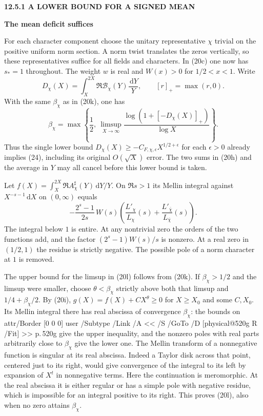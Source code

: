 \documentclass[11pt,letterpaper]{article}
\makeatletter
\newcommand{\rightmarktext}{}
\newcommand{\printfolio}{}
\newcommand{\leaf}[4]{\clearpage\gdef\printfolio{#1}\gdef\rightmarktext{#2}%
  {\small\sffamily\bfseries\color{ink}#3\par}\vspace{3pt}%
  {\LARGE\bfseries #4\par}\vspace{5pt}}
\newcommand{\dd}{\,\mathrm d}
\newcommand{\MusicPDFPageRef}[1]{\pdfpageref\csname physical@#1\endcsname\space\space 0 R}
\newcommand{\pagelink}[2]{\leavevmode\pdfstartlink attr{/Border [0 0 0]} user{%
  /Subtype /Link /A << /S /GoTo /D [\MusicPDFPageRef{#1} /Fit] >>}%
  {\color{ink}#2}\pdfendlink}
\newcommand{\pg}[1]{\pagelink{#1}{p.\,#1}}
\makeatother
\begin{document}
\leaf{520h}{A one-sided prime estimate}{12.5.1 \quad A LOWER BOUND FOR A SIGNED MEAN}{The mean deficit suffices}
For each character component choose the unitary representative $\chi$
trivial on the positive uniform norm section. A norm twist translates
the zeros vertically, so these representatives suffice for all fields
and characters. In (20c) one now has $s_*=1$ throughout. The weight
$w$ is real and $W(x)>0$ for $1/2<x<1$. Write
\[
       D_\chi(X)=\int_X^{2X}\Re\mathcal B_\chi(Y)\frac{\dd Y}{Y},
       \qquad [r]_+=\max(r,0).
\]
With the same $\beta_\chi$ as in (20k), one has
\[
 \beta_\chi=\max\left\{\frac12,\ \limsup_{X\to\infty}
       \frac{\log(1+[-D_\chi(X)]_+)}{\log X}\right\}.
 \tag{20l}
\]
Thus the single lower bound $D_\chi(X)\ge-C_{F,\chi,\epsilon}
X^{1/2+\epsilon}$ for each $\epsilon>0$ already implies (24),
including its original $O(\sqrt X)$ error. The two sums in (20h)
and the average in $Y$ may all cancel before this lower bound is taken.

Let $f(X)=\int_X^{2X}\Re A^\sharp_\chi(Y)\dd Y/Y$. On $\Re s>1$ its
Mellin integral against $X^{-s-1}\dd X$ on $(0,\infty)$ equals
\[
 -\frac{2^s-1}{2s}\,W(s)
 \left(\frac{L'_\chi}{L_\chi}(s)+\frac{L'_{\bar\chi}}{L_{\bar\chi}}(s)\right).
\]
The integral below $1$ is entire. At any nontrivial zero the orders of
the two functions add, and the factor $(2^s-1)W(s)/s$ is nonzero.
At a real zero in $(1/2,1)$ the residue is strictly negative. The
possible pole of a norm character at $1$ is removed.

The upper bound for the limsup in (20l) follows from (20k). If
$\beta_\chi>1/2$ and the limsup were smaller, choose $\theta<\beta_\chi$
strictly above both that limsup and $1/4+\beta_\chi/2$. By (20i),
$g(X)=f(X)+CX^\theta\ge0$ for $X\ge X_0$ and some $C,X_0$.
Its Mellin integral there has real abscissa of convergence $\beta_\chi$:
the bounds on \pg{520g} give the upper inequality, and the nonzero poles
with real parts arbitrarily close to $\beta_\chi$ give the lower one.
The Mellin transform of a nonnegative function is singular at its real
abscissa. Indeed a Taylor disk across that point, centered just to its
right, would give convergence of the integral to its left by expansion
of $X^t$ in nonnegative terms. Here the continuation is meromorphic.
At the real abscissa it is either regular or has a simple pole with
negative residue, which is impossible for an integral positive to its
right. This proves (20l), also when no zero attains $\beta_\chi$.
\end{document}

